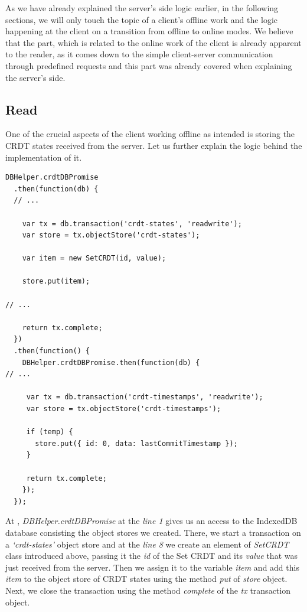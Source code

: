 As we have already explained the server's side logic earlier, in the following sections, we will only touch the topic of a client's offline work and the logic happening at the client on a transition from offline to online modes. We believe that the part, which is related to the online work of the client is already apparent to the reader, as it comes down to the simple client-server communication through predefined requests and this part was already covered when explaining the server's side. 

\subsection*{Read}

One of the crucial aspects of the client working offline as intended is storing the CRDT states received from the server. Let us further explain the logic behind the implementation of it.

\begin{lstlisting}[caption={Storing CRDT states in the local database after a successful request from the server.}, label={lst:dev9}]
DBHelper.crdtDBPromise
  .then(function(db) {
  // ...

    var tx = db.transaction('crdt-states', 'readwrite');
    var store = tx.objectStore('crdt-states');

    var item = new SetCRDT(id, value);

    store.put(item);

// ...

    return tx.complete;
  })
  .then(function() {
    DBHelper.crdtDBPromise.then(function(db) {
// ...

     var tx = db.transaction('crdt-timestamps', 'readwrite');
     var store = tx.objectStore('crdt-timestamps');

     if (temp) {
       store.put({ id: 0, data: lastCommitTimestamp });
     }

     return tx.complete;
    });
  });
\end{lstlisting}

At , \textit{DBHelper.crdtDBPromise} at the \textit{line 1} gives us an access to the IndexedDB database consisting the object stores we created. There, we start a transaction on a \textit{`crdt-states'} object store and at the \textit{line 8} we create an element of \textit{SetCRDT} class introduced above, passing it the \textit{id} of the Set CRDT and its \textit{value} that was just received from the server. Then we assign it to the variable \textit{item} and add this \textit{item} to the object store of CRDT states using the method \textit{put} of \textit{store} object. Next, we close the transaction using the method \textit{complete} of the \textit{tx} transaction object.

